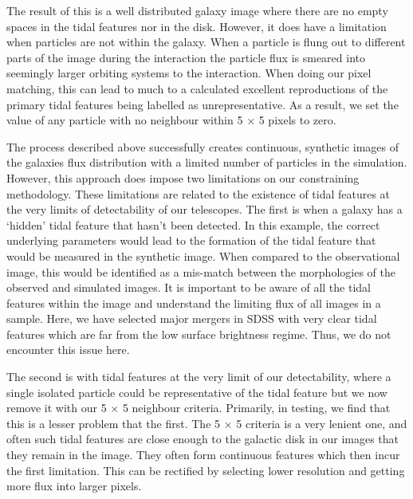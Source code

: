 The result of this is a well distributed galaxy image where there are no empty spaces in the tidal features nor in the disk. However, it does have a limitation when particles are not within the galaxy. When a particle is flung out to different parts of the image during the interaction the particle flux is smeared into seemingly larger orbiting systems to the interaction. When doing our pixel matching, this can lead to much to a calculated excellent reproductions of the primary tidal features being labelled as unrepresentative. As a result, we set the value of any particle with no neighbour within 5 $\times$ 5 pixels to zero. 

The process described above successfully creates continuous, synthetic images of the galaxies flux distribution with a limited number of particles in the simulation. However, this approach does impose two limitations on our constraining methodology. These limitations are related to the existence of tidal features at the very limits of detectability of our telescopes. The first is when a galaxy has a `hidden' tidal feature that hasn't been detected. In this example, the correct underlying parameters would lead to the formation of the tidal feature that would be measured in the synthetic image. When compared to the observational image, this would be identified as a mis-match between the morphologies of the observed and simulated images. It is important to be aware of all the tidal features within the image and understand the limiting flux of all images in a sample. Here, we have selected major mergers in SDSS with very clear tidal features which are far from the low surface brightness regime. Thus, we do not encounter this issue here.

The second is with tidal features at the very limit of our detectability, where a single isolated particle could be representative of the tidal feature but we now remove it with our 5 $\times$ 5 neighbour criteria. Primarily, in testing, we find that this is a lesser problem that the first. The 5 $\times$ 5 criteria is a very lenient one, and often such tidal features are close enough to the galactic disk in our images that they remain in the image. They often form continuous features which then incur the first limitation. This can be rectified by selecting lower resolution and getting more flux into larger pixels.

